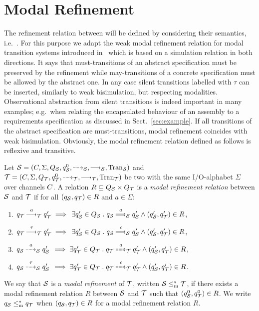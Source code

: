
\section{Modal Refinement}\label{sec:wmr}

The refinement relation between \MAIOPNs will be defined by considering their semantics, i.e.\ \MAIOTSs.
For this purpose we adapt the weak modal refinement relation for modal transition systems introduced in~\cite{DBLP:conf/ershov/HuttelL89}
which is based on a simulation relation in both directions.
It says that must-transitions of an abstract specification must be preserved by the refinement while 
may-transitions of a concrete specification must be allowed by the abstract one.
In any case silent transitions labelled with $\tau$ can be inserted, similarly to weak bisimulation,
but respecting modalities.
Observational abstraction from silent transitions is indeed important in many examples; e.g.\ when relating the encapsulated behaviour
of an assembly to a requirements specification as discussed in Sect.~\ref{sec:example}.
If all transitions of the abstract specification are must-transitions, modal refinement coincides
with weak bisimulation. Obviously, the modal refinement relation defined as follows is reflexive and transitive.

\begin{definition}\label{def:wmr}
   Let $\S = \maiotstupmr{\S}$ and $\T = \maiotstupmr{\T}$ be two \MAIOTSs with the same I/O-alphabet $\Sigma$ over channels $\chan$. 
    A relation $R \subseteq Q_\S \times Q_\T$ is a \emph{modal refinement relation} between $\S$ and $\T$ if for all $(q_\S,q_\T) \in R$ and $ a \in \Sigma$:%
    \begin{enumerate}[label=\arabic*:, ref=(\arabic*), leftmargin=*,start=1]
        \item\label{def:wmr:must:a-tgc} $ q_\T \must{a}_\T q_\T' \implies \,\exists q_\S' \in Q_\S \;.\; q_\S \mustw{a}_\S q_\S' \wedge (q_\S',q_\T') \in R$,
        \item\label{def:wmr:must:tau} $ q_\T \must{\tau}_\T q_\T' \implies \, \exists q_\S' \in Q_\S \;.\; q_\S \mustw{\epsilon}_\S q_\S' \wedge (q_\S',q_\T') \in R$,
        \item\label{def:wmr:may:a-tgc} $ q_\S \may{a}_\S q_\S'\, \implies \exists q_\T' \in Q_\T \;.\; q_\T \mayw{a}_\T q_\T' \wedge (q_\S',q_\T') \in R$,
        \item\label{def:wmr:may:tau} $ q_\S \may{\tau}_\S q_\S'\, \implies \exists q_\T' \in Q_\T \;.\; q_\T \mayw{\epsilon}_\T q_\T' \wedge (q_\S',q_\T') \in R$.
    \end{enumerate}
 We say that $\S$ is a \emph{modal refinement} of $\T$, written $\S \mrw \T$, if there exists a modal refinement relation $R$ between $\S$ and $\T$ such that $(q^0_{\S},q^0_{\T}) \in R$. We write $q_\S \mrw q_\T$ when $(q_{\S},q_{\T}) \in R$ for a modal refinement relation $R$. 
\end{definition}

